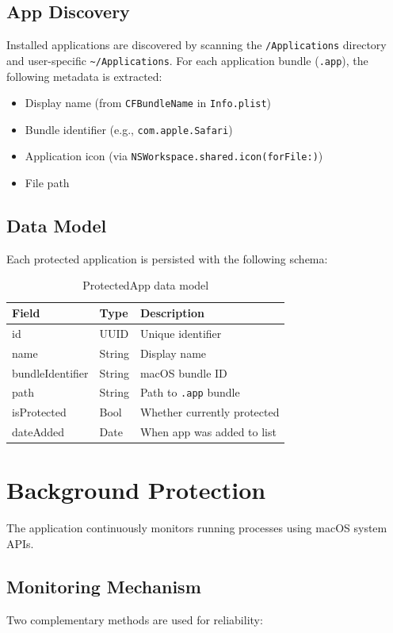 \documentclass[12pt,a4paper]{report}
\begin{document}
\subsection{App Discovery}
Installed applications are discovered by scanning the \texttt{/Applications} directory and user-specific \texttt{\textasciitilde/Applications}. For each application bundle (\texttt{.app}), the following metadata is extracted:

\begin{itemize}[noitemsep]
    \item Display name (from \texttt{CFBundleName} in \texttt{Info.plist})
    \item Bundle identifier (e.g., \texttt{com.apple.Safari})
    \item Application icon (via \texttt{NSWorkspace.shared.icon(forFile:)})
    \item File path
\end{itemize}

\subsection{Data Model}
Each protected application is persisted with the following schema:

\begin{table}[H]
\centering
\begin{tabular}{lll}
\toprule
\textbf{Field} & \textbf{Type} & \textbf{Description} \\
\midrule
id & UUID & Unique identifier \\
name & String & Display name \\
bundleIdentifier & String & macOS bundle ID \\
path & String & Path to \texttt{.app} bundle \\
isProtected & Bool & Whether currently protected \\
dateAdded & Date & When app was added to list \\
\bottomrule
\end{tabular}
\caption{ProtectedApp data model}
\end{table}

\section{Background Protection}
The application continuously monitors running processes using macOS system APIs.

\subsection{Monitoring Mechanism}
Two complementary methods are used for reliability:
\end{document}
